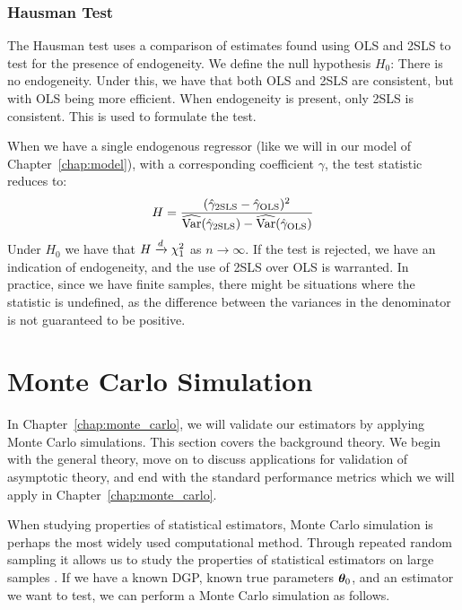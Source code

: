 \subsubsection{Hausman Test}

The Hausman test \parencite{Hausman1978} uses a comparison of estimates found using OLS and 2SLS to test for the presence of endogeneity. We define the null hypothesis $H_0$: There is no endogeneity. Under this, we have that both OLS and 2SLS are consistent, but with OLS being more efficient. When endogeneity is present, only 2SLS is consistent. This is used to formulate the test.

When we have a single endogenous regressor (like we will in our model of Chapter~\ref{chap:model}), with a corresponding coefficient $\gamma$, the test statistic reduces to:
\begin{equation}
\label{eq:hausman}
    H = \frac{(\hat{\gamma}_{\text{2SLS}} - \hat{\gamma}_{\text{OLS}})^2}{\widehat{\operatorname{Var}}(\hat{\gamma}_{\text{2SLS}}) - \widehat{\operatorname{Var}}(\hat{\gamma}_{\text{OLS}})}
\end{equation}
Under $H_0$ we have that $H \xrightarrow{d} \chi^2_1$ as $n \to \infty$. If the test is rejected, we have an indication of endogeneity, and the use of 2SLS over OLS is warranted. In practice, since we have finite samples, there might be situations where the statistic is undefined, as the difference between the variances in the denominator is not guaranteed to be positive.

\section{Monte Carlo Simulation}
\label{sec:bg:monte_carlo}
In Chapter~\ref{chap:monte_carlo}, we will validate our estimators by applying Monte Carlo simulations. This section covers the background theory. We begin with the general theory, move on to discuss applications for validation of asymptotic theory, and end with the standard performance metrics which we will apply in Chapter~\ref{chap:monte_carlo}.

When studying properties of statistical estimators, Monte Carlo simulation is perhaps the most widely used computational method. Through repeated random sampling it allows us to study the properties of statistical estimators on large samples \parencite{Robert2004, MorrisWhiteEtAl2019}. If we have a known DGP, known true parameters $\bm{\theta}_0$, and an estimator we want to test, we can perform a Monte Carlo simulation as follows.

